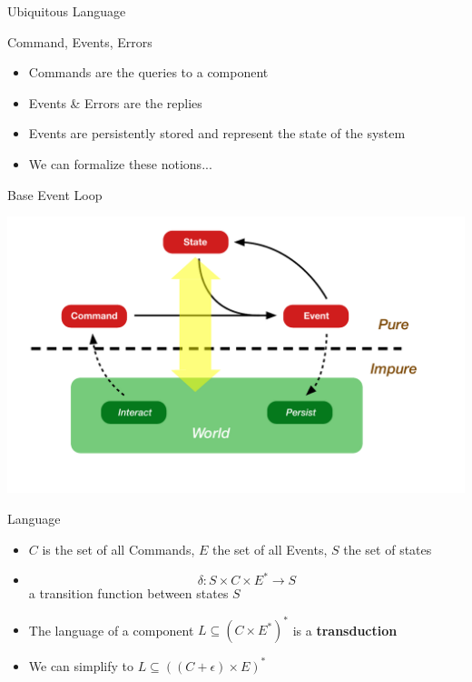 \begin{frame}[fragile]{Ubiquitous Language}

\begin{center}
\end{center}
\end{frame}

\begin{frame}[fragile]{Command, Events, Errors}

  \begin{itemize}
  \item Commands are the queries to a component
  \item Events \& Errors are the replies
  \item Events are persistently stored and represent the state of the system
  \item We can formalize these notions...
  \end{itemize}
\end{frame}

\begin{frame}[fragile]{Base Event Loop}
\begin{center}
\includegraphics[width=\textwidth]{./images/event-loop.pdf}
\end{center}
\end{frame}

\begin{frame}[fragile]{Language}
  \begin{itemize}
  \item $C$ is the set of all Commands, $E$ the set of all Events, $S$ the set of states
  \item $$\delta : S \times C \times E^* \rightarrow S$$ a transition function between states $S$
  \item The language of a component $L \subseteq (C \times E^*)^*$ is a \textbf{transduction}
  \item We can simplify to $L \subseteq ((C + \epsilon) \times E)^*$
  \end{itemize}
\end{frame}

